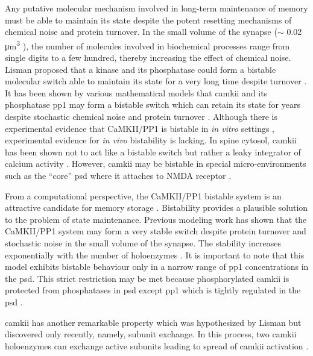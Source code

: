 \documentclass[9pt,lineno,doublespacing]{elife}
\begin{document}
Any putative molecular mechanism involved in long-term maintenance of memory
must be able to maintain its state despite the potent resetting mechanisms of
chemical noise and protein turnover.  In the small volume of the synapse ($\sim$
0.02 \si{\micro\meter^3} \citep{bartol_nanoconnectomic_2015}), the number of
molecules involved in biochemical processes range from single digits to a few
hundred, thereby increasing the effect of chemical noise.  Lisman proposed that
a kinase and its phosphatase could form a bistable molecular switch able to
maintain its state for a very long time despite turnover
\citep{lisman_mechanism_1985}. It has been shown by various mathematical models
that \gls{camkii} and its phosphatase \gls{pp1} may form a bistable switch
\citep{zhabotinsky_bistability_2000} which can retain its state for years
despite stochastic chemical noise and protein turnover
\citep{miller_stability_2005}. Although there is experimental evidence that
CaMKII/PP1 is bistable in \emph{in vitro} settings
\citep{bradshaw_ultrasensitive_2003,urakubo_vitro_2014}, experimental evidence
for \emph{in vivo} bistability is lacking. In spine cytosol, \gls{camkii} has
been shown not to act like a bistable switch but rather a leaky integrator of
calcium activity \citep{chang_camkii_2017}.  However, \gls{camkii} may be
bistable in special micro-environments such as the ``core'' \gls{psd} where it
attaches to NMDA receptor \citep{dosemeci_postsynaptic_2016,
petersen_distribution_2003}.

From a computational perspective, the CaMKII/PP1 bistable system is an attractive
candidate for memory storage \citep{koch_biophysics_2004}.  Bistability provides
a plausible solution to the problem of state maintenance. Previous modeling work
has shown that the CaMKII/PP1 system may form a very stable switch despite protein 
turnover and stochastic noise in the small volume of the synapse.  The stability
increases exponentially with the number of holoenzymes
\citep{miller_stability_2005}. It is important to note that this model exhibits
bistable behaviour only in a narrow range of \gls{pp1} concentrations in the
\gls{psd}. This strict restriction may be met because phosphorylated
\gls{camkii} is protected from phosphatases in \gls{psd} except \gls{pp1}
\citep{strack_differential_1997} which is tightly regulated in the \gls{psd}
\citep{bollen_extended_2010}. 

\gls{camkii} has another remarkable property which was hypothesized by Lisman
\citep{lisman_cam_1994} but discovered only recently, namely, subunit exchange.
In this process, two \gls{camkii} holoenzymes can exchange active subunits
leading to spread of \gls{camkii} activation \citep{stratton_activation-triggered_2014}.
\end{document}
